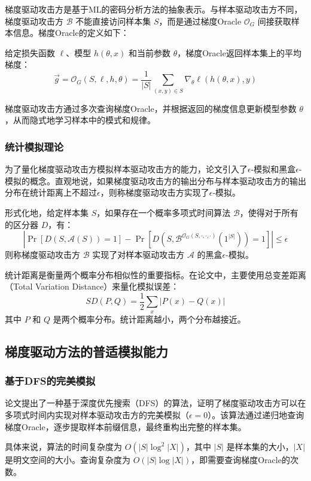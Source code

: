 \documentclass{article}
\newcommand{\grad}{\nabla}
\newcommand{\mc}[1]{\mathcal{#1}}
\newcommand{\prob}[1]{\Pr\left[#1\right]}
\begin{document}
梯度驱动攻击方是基于ML的密码分析方法的抽象表示。与样本驱动攻击方不同，梯度驱动攻击方 \( \mc{B} \) 不能直接访问样本集 \( S \)，而是通过梯度Oracle \( \mc{O}_G \) 间接获取样本信息。梯度Oracle的定义如下：

给定损失函数 \( \ell \)、模型 \( h(\theta, x) \) 和当前参数 \( \theta \)，梯度Oracle返回样本集上的平均梯度：
\[
\vec{g} = \mc{O}_G(S, \ell, h, \theta) = \frac{1}{|S|} \sum_{(x, y) \in S} \grad_{\theta} \ell(h(\theta, x), y)
\]

梯度驱动攻击方通过多次查询梯度Oracle，并根据返回的梯度信息更新模型参数 \( \theta \)，从而隐式地学习样本中的模式和规律。

\subsubsection{统计模拟理论}
为了量化梯度驱动攻击方模拟样本驱动攻击方的能力，论文引入了\(\epsilon\)-模拟和黑盒\(\epsilon\)-模拟的概念。直观地说，如果梯度驱动攻击方的输出分布与样本驱动攻击方的输出分布在统计距离上不超过\(\epsilon\)，则称梯度驱动攻击方实现了\(\epsilon\)-模拟。

形式化地，给定样本集 \( S \)，如果存在一个概率多项式时间算法 \( \mc{B} \)，使得对于所有的区分器 \( D \)，有：
\[
\left| \prob{D(S, \mc{A}(S)) = 1} - \prob{D(S, \mc{B}^{\mc{O}_G(S, \cdot, \cdot, \cdot)}(1^{|S|})) = 1} \right| \leq \epsilon
\]
则称梯度驱动攻击方 \( \mc{B} \) 实现了对样本驱动攻击方 \( \mc{A} \) 的黑盒\(\epsilon\)-模拟。

统计距离是衡量两个概率分布相似性的重要指标。在论文中，主要使用总变差距离（Total Variation Distance）来量化模拟误差：
\[
SD(P, Q) = \frac{1}{2} \sum_x |P(x) - Q(x)|
\]
其中 \( P \) 和 \( Q \) 是两个概率分布。统计距离越小，两个分布越接近。

\subsection{梯度驱动方法的普适模拟能力}
\subsubsection{基于DFS的完美模拟}
论文提出了一种基于深度优先搜索（DFS）的算法，证明了梯度驱动攻击方可以在多项式时间内实现对样本驱动攻击方的完美模拟（\(\epsilon = 0\)）。该算法通过递归地查询梯度Oracle，逐步提取样本前缀信息，最终重构出完整的样本集。

具体来说，算法的时间复杂度为 \( O(|S| \log^2 |X|) \)，其中 \( |S| \) 是样本集的大小，\( |X| \) 是明文空间的大小。查询复杂度为 \( O(|S| \log |X|) \)，即需要查询梯度Oracle的次数。
\end{document}
